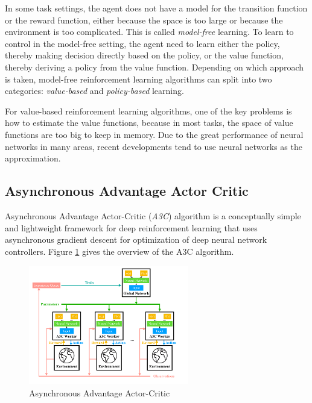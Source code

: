         In some task settings,
        the agent does not have a model for the transition function or the reward function,
        either because the space is too large or because the environment is too complicated.
        This is called \emph{model-free} learning.
        To learn to control in the model-free setting, the agent need to learn either
        the policy, thereby making decision directly based on the policy,
        or the value function, thereby deriving a policy from the value function.
        Depending on which approach is taken,
        model-free reinforcement learning algorithms can split into two categories:
        \emph{value-based} and \emph{policy-based} learning.

        For value-based reinforcement learning algorithms,
        one of the key problems is how to estimate the value functions,
        because in most tasks, the space of value functions are too big to keep in memory.
        Due to the great performance of neural networks in many areas,
        recent developments tend to use neural networks as the approximation.

    \subsection{Asynchronous Advantage Actor Critic}

        Asynchronous Advantage Actor-Critic \cite{mnih_asynchronous_2016} (\emph{A3C}) algorithm is
        a conceptually simple and lightweight framework for deep reinforcement learning
        that uses asynchronous gradient descent for optimization of deep neural network controllers.
        Figure \ref{fig:a3c} gives the overview of the A3C algorithm.

        \begin{figure}[htp]
            \centering
            \includegraphics[width=0.62\textwidth]{img/a3c.pdf}
            \caption{Asynchronous Advantage Actor-Critic}
            \label{fig:a3c}
        \end{figure}


